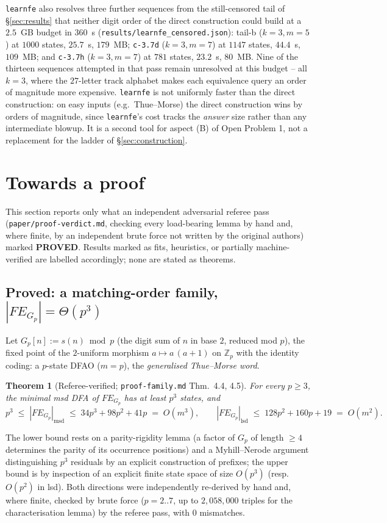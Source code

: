 \documentclass[11pt]{article}
\newtheorem{theorem}{Theorem}[section]
\begin{document}
\texttt{learnfe} also resolves three further sequences from the still-censored tail of
\S\ref{sec:results} that neither digit order of the direct construction could build at a
$2.5$~GB budget in $360$~s (\texttt{results/learnfe\_censored.json}): tail-b
($k{=}3,m{=}5$) at $1000$ states, $25.7$~s, $179$~MB; \texttt{c-3.7d} ($k{=}3,m{=}7$) at
$1147$ states, $44.4$~s, $109$~MB; and \texttt{c-3.7h} ($k{=}3,m{=}7$) at $781$ states,
$23.2$~s, $80$~MB. Nine of the thirteen sequences attempted in that pass remain
unresolved at this budget -- all $k=3$, where the $27$-letter track alphabet makes each
equivalence query an order of magnitude more expensive. \texttt{learnfe} is not
uniformly faster than the direct construction: on easy inputs (e.g.\ Thue--Morse) the
direct construction wins by orders of magnitude, since \texttt{learnfe}'s cost tracks the
\emph{answer} size rather than any intermediate blowup. It is a second tool for aspect
(B) of Open Problem 1, not a replacement for the ladder of \S\ref{sec:construction}.

\section{Towards a proof}
\label{sec:theory}

This section reports only what an independent adversarial referee pass
(\texttt{paper/proof-verdict.md}, checking every load-bearing lemma by hand and, where
finite, by an independent brute force not written by the original authors) marked
\textbf{PROVED}. Results marked as fits, heuristics, or partially machine-verified are
labelled accordingly; none are stated as theorems.

\subsection{Proved: a matching-order family, $|FE_{G_p}| = \Theta(p^3)$}

Let $G_p[n] := s(n) \bmod p$ (the digit sum of $n$ in base $2$, reduced mod $p$), the
fixed point of the $2$-uniform morphism $a\mapsto a\,(a{+}1)$ on $\mathbb Z_p$ with the
identity coding: a $p$-state DFAO ($m=p$), the \emph{generalised Thue--Morse word}.

\begin{theorem}[Referee-verified; \texttt{proof-family.md} Thm.\ 4.4, 4.5]
\label{thm:gp}
For every $p\ge3$, the minimal msd DFA of $FE_{G_p}$ has at least $p^3$ states, and
$$p^3 \;\le\; |FE_{G_p}|_{\mathrm{msd}} \;\le\; 34p^3+98p^2+41p \;=\; O(m^3),\qquad
|FE_{G_p}|_{\mathrm{lsd}} \;\le\; 128p^2+160p+19 \;=\; O(m^2).$$
\end{theorem}
The lower bound rests on a parity-rigidity lemma (a factor of $G_p$ of length $\ge4$
determines the parity of its occurrence positions) and a Myhill--Nerode argument
distinguishing $p^3$ residuals by an explicit construction of prefixes; the upper bound
is by inspection of an explicit finite state space of size $O(p^3)$ (resp.\ $O(p^2)$ in
lsd). Both directions were independently re-derived by hand and, where finite, checked by
brute force ($p=2..7$, up to $2{,}058{,}000$ triples for the characterisation lemma) by
the referee pass, with $0$ mismatches.
\end{document}
